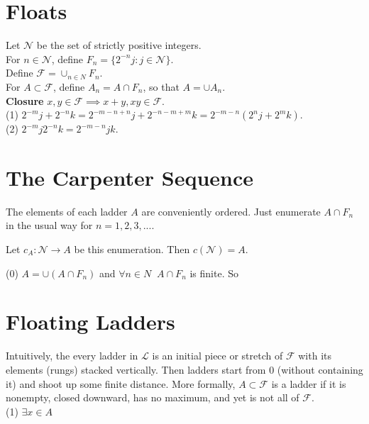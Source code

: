\documentclass[10pt]{article}
\newcommand{\ladders}{ \mathscr{L}}
\newcommand{\dyadics}{ \mathscr{F}}
\newcommand{\naturals}{ \mathscr{N}}
\newcommand{\carpenter}{ c }
\begin{document}
\section{Floats}

Let $\naturals$ be the set of strictly positive integers.\\

For $n \in \naturals$, define  $F_n = \{ 2^{-n}j : j \in \naturals \}$. \\

Define $\dyadics = \cup_{n \in N} F_n$.\\

For $A \subset \dyadics$, define $A_n = A \cap F_n$, so that $A = \cup A_n$.\\



\textbf{Closure} $x,y \in \dyadics \implies  x+y,xy \in \dyadics$.\\

(1) \;\;$2^{-m}j + 2^{-n}k = 2^{-m-n+n}j + 2^{-n-m+m}k = 2^{-m-n}(2^nj+2^mk)$.\\

(2) \;\; $2^{-m}j 2^{-n}k = 2^{-m-n}jk$.\\

\section{The Carpenter Sequence}
The elements of each ladder $A$ are conveniently ordered. Just enumerate $A \cap F_n$ in the usual way for $n = 1,2,3,...$.

Let $\carpenter_A : \naturals \to A$ be this enumeration. Then $\carpenter(\naturals) = A.$

(0) $A = \cup (A \cap F_n)$ and $\forall n \in N \;\; A \cap F_n$ is finite. So  

\section{Floating Ladders}

Intuitively, the every ladder in $\ladders$ is an initial piece or stretch of $\dyadics$ with its elements (rungs) stacked vertically. Then ladders start from $0$ (without containing it) and shoot up some finite distance. More formally, $A \subset \dyadics$ is a ladder if it is nonempty, closed downward, has no maximum, and yet is not all of $\dyadics$.\\

(1) $\exists x \in A$
\end{document}
